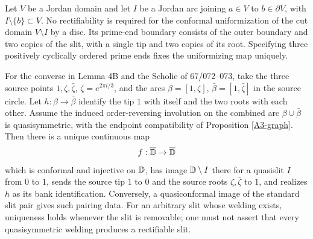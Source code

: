 \begin{theorem}\label{A3-slit}
Let $V$ be a Jordan domain and let $I$ be a Jordan arc joining $a\in V$ to $b\in\partial V$, with $I\setminus\{b\}\subset V$. No rectifiability is required for the conformal uniformization of the cut domain $V\setminus I$ by a disc. Its prime-end boundary consists of the outer boundary and two copies of the slit, with a single tip and two copies of its root. Specifying three positively cyclically ordered prime ends fixes the uniformizing map uniquely.

For the converse in Lemma 4B and the Scholie of 67/072--073, take the three source points $1,\zeta,\bar\zeta$, $\zeta=e^{2\pi i/3}$, and the arcs $\beta=[1,\zeta]$, $\bar\beta=[1,\bar\zeta]$ in the source circle. Let $h:\beta\to\bar\beta$ identify the tip $1$ with itself and the two roots with each other. Assume the induced order-reversing involution on the combined arc $\beta\cup\bar\beta$ is quasisymmetric, with the endpoint compatibility of Proposition \ref{A3-graph}. Then there is a unique continuous map
\[
 f:\overline{{\mathbb{D}}}\to\overline{{\mathbb{D}}}
\]
which is conformal and injective on ${\mathbb{D}}$, has image ${\mathbb{D}}\setminus I$ there for a quasislit $I$ from $0$ to $1$, sends the source tip $1$ to $0$ and the source roots $\zeta,\bar\zeta$ to $1$, and realizes $h$ as its bank identification. Conversely, a quasiconformal image of the standard slit pair gives such pairing data. For an arbitrary slit whose welding exists, uniqueness holds whenever the slit is removable; one must not assert that every quasisymmetric welding produces a rectifiable slit.
\end{theorem}
